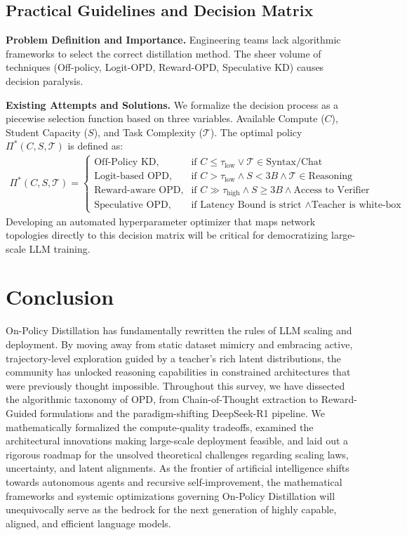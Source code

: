 \documentclass{article} %
\begin{document}
\subsection{Practical Guidelines and Decision Matrix}
\textbf{Problem Definition and Importance.} Engineering teams lack algorithmic frameworks to select the correct distillation method. The sheer volume of techniques (Off-policy, Logit-OPD, Reward-OPD, Speculative KD) causes decision paralysis.

\textbf{Existing Attempts and Solutions.} We formalize the decision process as a piecewise selection function based on three variables. Available Compute ($C$), Student Capacity ($S$), and Task Complexity ($\mathcal{T}$). The optimal policy $\Pi^*(C, S, \mathcal{T})$ is defined as:
\begin{align}
\Pi^*(C, S, \mathcal{T}) = 
\begin{cases} 
\text{Off-Policy KD}, & \text{if } C \le \tau_{\text{low}} \lor \mathcal{T} \in \text{Syntax/Chat} \\
\text{Logit-based OPD}, & \text{if } C > \tau_{\text{low}} \land S < 3B \land \mathcal{T} \in \text{Reasoning} \\
\text{Reward-aware OPD}, & \text{if } C \gg \tau_{\text{high}} \land S \ge 3B \land \text{Access to Verifier} \\
\text{Speculative OPD}, & \text{if Latency Bound is strict } \land \text{Teacher is white-box}
\end{cases}
\end{align}
Developing an automated hyperparameter optimizer that maps network topologies directly to this decision matrix will be critical for democratizing large-scale LLM training.

\section{Conclusion}
\label{sec:conclusion}
On-Policy Distillation has fundamentally rewritten the rules of LLM scaling and deployment. By moving away from static dataset mimicry and embracing active, trajectory-level exploration guided by a teacher's rich latent distributions, the community has unlocked reasoning capabilities in constrained architectures that were previously thought impossible. Throughout this survey, we have dissected the algorithmic taxonomy of OPD, from Chain-of-Thought extraction to Reward-Guided formulations and the paradigm-shifting DeepSeek-R1 pipeline. We mathematically formalized the compute-quality tradeoffs, examined the architectural innovations making large-scale deployment feasible, and laid out a rigorous roadmap for the unsolved theoretical challenges regarding scaling laws, uncertainty, and latent alignments. As the frontier of artificial intelligence shifts towards autonomous agents and recursive self-improvement, the mathematical frameworks and systemic optimizations governing On-Policy Distillation will unequivocally serve as the bedrock for the next generation of highly capable, aligned, and efficient language models.
\end{document}
